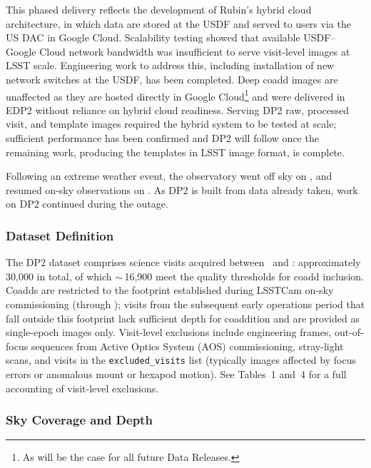 This phased delivery reflects the development of Rubin's hybrid cloud architecture, in which data are stored at the USDF and served to users via the US DAC in Google Cloud.
Scalability testing showed that available USDF--Google Cloud network bandwidth was insufficient to serve visit-level images at LSST scale.
Engineering work to address this, including installation of new network switches at the USDF, has been completed.
Deep coadd images are unaffected as they are hosted directly in Google Cloud\footnote{As will be the case for all future Data Releases.} and were delivered in EDP2 without reliance on hybrid cloud readiness.
Serving DP2 raw, processed visit, and template images required the hybrid system to be tested at scale; sufficient performance has been confirmed and DP2 will follow once the remaining work, producing the templates in LSST image format, is complete.

Following an extreme weather event, the observatory went off sky on \elninooffsky, and resumed on-sky observations on \elninoonsky.
As DP2 is built from data already taken, work on DP2 continued during the outage.

\subsubsection{Dataset Definition}
\label{sssec:dp2-sky}

The DP2 dataset comprises science visits acquired between \startsciencelsstcam\ and \dptwocutoffdate: approximately 30,000 in total, of which $\sim$\,16,900 meet the quality thresholds for coadd inclusion.
Coadds are restricted to the footprint established during LSSTCam on-sky commissioning (through \finonskylsstcam); visits from the subsequent early operations period that fall outside this footprint lack sufficient depth for coaddition and are provided as single-epoch images only.
Visit-level exclusions include engineering frames, out-of-focus sequences from Active Optics System (AOS) commissioning, stray-light scans, and visits in the \texttt{excluded\_visits} list (typically images affected by focus errors or anomalous mount or hexapod motion).
See  Tables~1 and~4 for a full accounting of visit-level exclusions.

\subsubsection{Sky Coverage and Depth}

